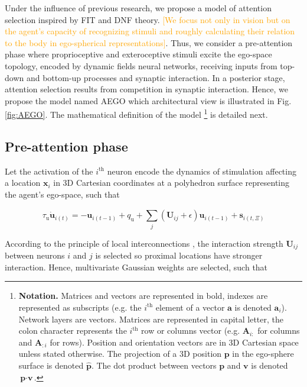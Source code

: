 \documentclass[letterpaper, 10 pt, conference]{ieeeconf}  %
\begin{document}
	Under the influence of previous research, we propose a model of attention selection inspired by FIT and DNF theory. \textcolor{orange}{[We focus not only in vision but on the agent's capacity of recognizing stimuli and roughly calculating their relation to the body in ego-spherical representations]}. Thus, we consider a pre-attention phase where proprioceptive and exteroceptive stimuli excite the ego-space topology, encoded by dynamic fields neural networks, receiving inputs from top-down and bottom-up processes and synaptic interaction. In a posterior stage, attention selection results from competition in synaptic interaction. Hence, we propose the model named AEGO which architectural view is illustrated in Fig. \ref{fig:AEGO}. The mathematical definition of the model \footnote{\scriptsize \textbf{Notation.} Matrices and vectors are represented in bold, indexes are represented as subscripts (e.g. the $i^{\mathrm{th}}$ element of a vector $\mathbf{a}$ is denoted $\mathbf{a}_{i}$). Network layers are vectors. Matrices are represented in capital letter, the colon character represents the $i^{\mathrm{th}}$ row or columns vector (e.g. $\mathbf{A}_{i:}$ for columns and $\mathbf{A}_{:i}$ for rows). Position and orientation vectors are in 3D Cartesian space unless stated otherwise. The projection of a 3D position $\mathbf{p}$ in the ego-sphere surface is denoted $\mathbf{\hat{p}}$. The dot product between vectors $\textbf{p}$ and $\textbf{v}$ is denoted $\textbf{p}\cdot\textbf{v}$.} is detailed next.
	
	
	\subsection{Pre-attention phase}
	Let the activation of the $i^\mathrm{th}$ neuron encode the dynamics of stimulation affecting a location  $\mathbf{x}_i$ in 3D Cartesian coordinates at a polyhedron surface representing the agent's ego-space, such that 
		
	\begin{equation}
	\tau_\mathrm{u} \dot{\mathbf{u}}_{i(t)} = -\mathbf{u}_{i(t-1)} + q_\mathrm{u} + \sum_{j}^{} (\mathbf{U}_{ij}+\epsilon)\mathbf{u}_{i(t-1)} + \mathbf{s}_{i(t,\Xi)} 
	\label{eq:pre-sel}
	\end{equation}

	According to the principle of local interconnections \cite{samsonovich97}, the interaction strength $\mathbf{U}_{ij}$ between neurons $i$ and $j$ is selected so proximal locations have stronger interaction. Hence, multivariate Gaussian weights are selected, such that
	
\end{document}
